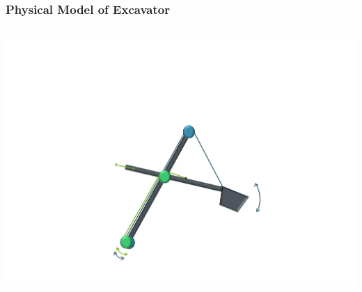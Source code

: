 \begin{frame}
	\frametitle{Physical Model of Excavator}
	
	
	\begin{columns}
		\centering
		\includegraphics[trim=30cm 5cm 30cm 23cm, clip=true, width=\linewidth]{img/Excavator_Only}
	\end{columns}
	
\end{frame}

%	
%	
%	
%	
%	

